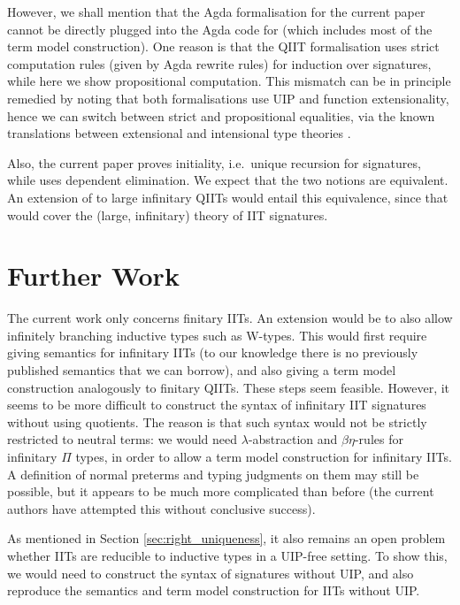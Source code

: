 \documentclass[a4paper,UKenglish,cleveref, autoref]{lipics-v2019}
\begin{document}
However, we shall mention that the Agda formalisation for the current paper
cannot be directly plugged into the Agda code for
\cite{Kaposi:2019:CQI:3302515.3290315} (which includes most of the term model
construction). One reason is that the QIIT formalisation uses strict computation
rules (given by Agda rewrite rules) for induction over signatures, while here we show propositional
computation. This mismatch can be in principle remedied by noting that both
formalisations use UIP and function extensionality, hence we can switch between
strict and propositional equalities, via the known translations between
extensional and intensional type
theories \cite{hofmann95extensional,winterhalter2019eliminating}.

Also, the current paper proves initiality, i.e.\ unique recursion for
signatures, while \cite{Kaposi:2019:CQI:3302515.3290315} uses dependent
elimination. We expect that the two notions are equivalent. An extension of
\cite{Kaposi:2019:CQI:3302515.3290315} to large infinitary QIITs would entail
this equivalence, since that would cover the (large, infinitary) theory of IIT
signatures.


\section{Further Work}

The current work only concerns finitary IITs. An extension would be to also
allow infinitely branching inductive types such as W-types. This would first
require giving semantics for infinitary IITs (to our knowledge there is no
previously published semantics that we can borrow), and also giving a term model
construction analogously to finitary QIITs. These steps seem feasible. However,
it seems to be more difficult to construct the syntax of infinitary IIT
signatures without using quotients. The reason is that such syntax would not be
strictly restricted to neutral terms: we would need $\lambda$-abstraction and
$\beta\eta$-rules for infinitary $\Pi$ types, in order to allow a term model
construction for infinitary IITs. A definition of normal preterms and typing
judgments on them may still be possible, but it appears to be much more
complicated than before (the current authors have attempted this without
conclusive success).

As mentioned in Section \ref{sec:right_uniqueness}, it also remains an open
problem whether IITs are reducible to inductive types in a UIP-free setting. To
show this, we would need to construct the syntax of signatures without UIP, and
also reproduce the semantics and term model construction for IITs without UIP.


\end{document}
